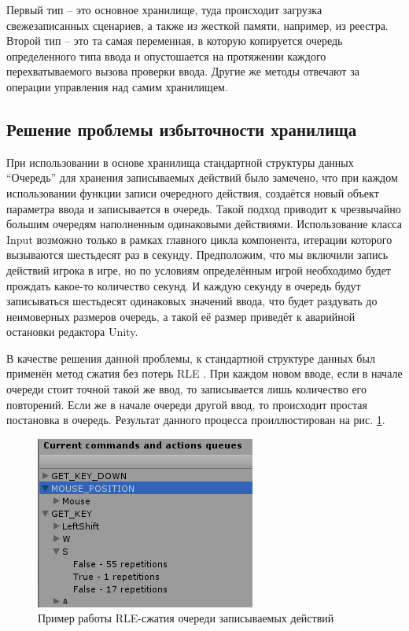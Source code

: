 Первый тип -- это основное хранилище, туда происходит загрузка свежезаписанных сценариев, а также из жесткой памяти, например, из реестра. Второй тип -- это та самая переменная, в которую копируется очередь определенного типа ввода и опустошается на протяжении каждого перехватываемого вызова проверки ввода. Другие же методы отвечают за операции управления над самим хранилищем.

\subsection{Решение проблемы избыточности хранилища}
При использовании в основе хранилища стандартной структуры данных ``Очередь'' для хранения записываемых действий было замечено, что при каждом использовании функции записи очередного действия, создаётся новый объект параметра ввода и записывается в очередь. Такой подход приводит к чрезвычайно большим очередям наполненным одинаковыми действиями. Использование класса Input возможно только в рамках главного цикла компонента, итерации которого вызываются шестьдесят раз в секунду. Предположим, что мы включили запись действий игрока в игре, но по условиям определённым игрой необходимо будет прождать какое-то количество секунд. И каждую секунду в очередь будут записываться шестьдесят одинаковых значений ввода, что будет раздувать до неимоверных размеров очередь, а такой её размер приведёт к аварийной остановки редактора Unity.

В качестве решения данной проблемы, к стандартной структуре данных был применён метод сжатия без потерь RLE \cite{rle}. При каждом новом вводе, если в начале очереди стоит точной такой же ввод, то записывается лишь количество его повторений. Если же в начале очереди другой ввод, то происходит простая постановка в очередь. Результат данного процесса проиллюстирован на рис. \ref{storageContains}.

\begin{figure}[h]
	\centering
	\includegraphics[width=0.5\linewidth]{storageContains.png}
	\caption{Пример работы RLE-сжатия очереди записываемых действий}
	\label{storageContains}
\end{figure}

